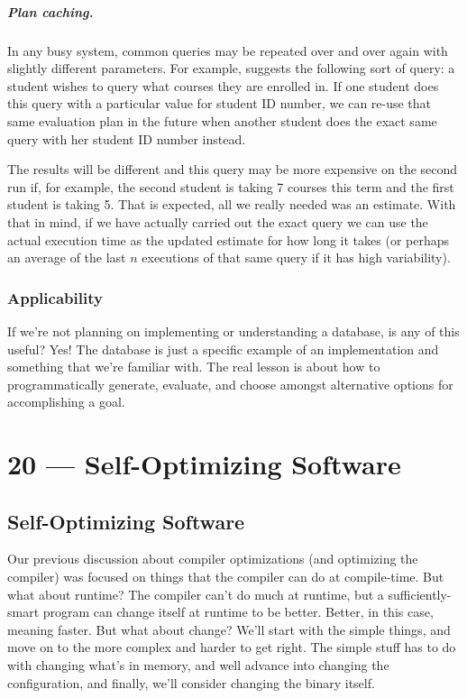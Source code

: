 \documentclass[a4paper]{report}
\begin{document}
\paragraph{Plan caching.} In any busy system, common queries may be repeated over and over again with slightly different parameters. For example, \cite{dsc} suggests the following sort of query: a student wishes to query what courses they are enrolled in. If one student does this query with a particular value for student ID number, we can re-use that same evaluation plan in the future when another student does the exact same query with her student ID number instead. 

The results will be different and this query may be more expensive on the second run if, for example, the second student is taking 7 courses this term and the first student is taking 5. That is expected, all we really needed was an estimate. With that in mind, if we have actually carried out the exact query we can use the actual execution time as the updated estimate for how long it takes (or perhaps an average of the last $n$ executions of that same query if it has high variability). 

\subsection*{Applicability}
If we're not planning on implementing or understanding a database, is any of this useful? Yes! The database is just a specific example of an implementation and something that we're familiar with. The real lesson is about how to programmatically generate, evaluate, and choose amongst alternative options for accomplishing a goal. 









\chapter*{20 --- Self-Optimizing Software}


\section*{Self-Optimizing Software}
Our previous discussion about compiler optimizations (and optimizing the compiler) was focused on things that the compiler can do at compile-time. But what about runtime? The compiler can't do much at runtime, but a sufficiently-smart program can change itself at runtime to be better. Better, in this case, meaning faster. But what about change? We'll start with the simple things, and move on to the more complex  and harder to get right. The simple stuff has to do with changing what's in memory, and well advance into changing the configuration, and finally, we'll consider changing the binary itself.
\end{document}
